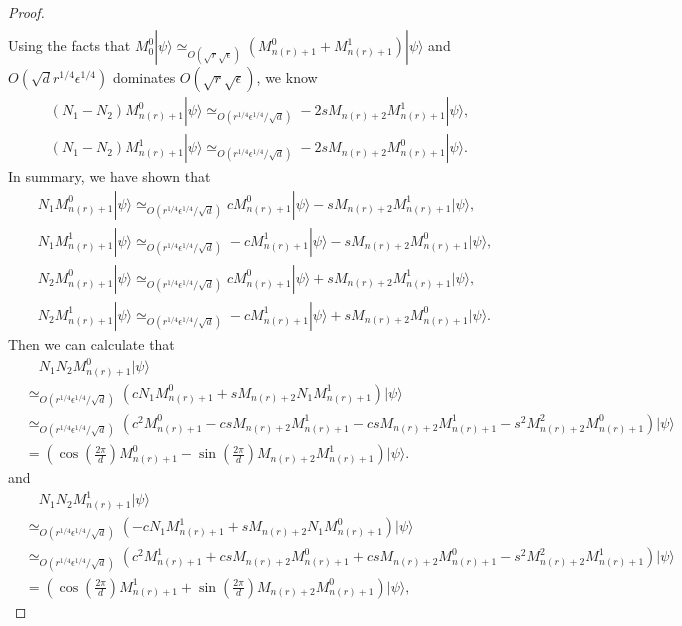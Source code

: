 \documentclass[11pt,letterpaper]{article}
\newcommand{\ket}[1]{|#1\rangle}
\newcommand{\1}{\mathbb{1}}
\newcommand{\nr}{n(r)}
\newcommand{\se}{\sqrt{\epsilon}}
\newcommand{\qe}{\epsilon^{1/4}}
\newcommand{\sd}{\sqrt{d}}
\newcommand{\sr}{\sqrt{r}}
\newcommand{\qr}{r^{1/4}}
\newcommand{\appd}[1]{\simeq_{#1}}
\theoremstyle{definition}
\begin{document}
\begin{proof}
\begin{align*}
	\end{align*}
	Using the facts that $M_0^0 \ket{\psi} \appd{O(\sr \se)} (M_{\nr+1}^0 + M_{\nr+1}^1) \ket{\psi}$
	and $O(\sd \qr \qe)$ dominates $O(\sr \se)$, we know
	\begin{align}
		(N_1-N_2) M_{\nr+1}^0 \ket{\psi} \appd{O(\qr\qe/\sd )} -2sM_{\nr+2} M_{\nr+1}^1 \ket{\psi},\\
		(N_1-N_2) M_{\nr+1}^1 \ket{\psi}\appd{O(\qr\qe/\sd )} -2sM_{\nr+2} M_{\nr+1}^0 \ket{\psi}.
	\end{align}
	In summary, we have shown that 
        \begin{align*}
        		&N_1M_{\nr+1}^0 \ket{\psi} \appd{O(\qr \qe/ \sd)} cM_{\nr+1}^0\ket{\psi} - sM_{\nr+2}M_{\nr+1}^1\ket{\psi},\\
        		&N_1M_{\nr+1}^1 \ket{\psi} \appd{O(\qr \qe/ \sd)} -cM_{\nr+1}^1\ket{\psi} - sM_{\nr+2}M_{\nr+1}^0\ket{\psi},\\
        		&N_2M_{\nr+1}^0 \ket{\psi} \appd{O( \qr \qe /\sd)} cM_{\nr+1}^0\ket{\psi} + sM_{\nr+2}M_{\nr+1}^1\ket{\psi},\\
        		&N_2M_{\nr+1}^1 \ket{\psi} \appd{O(\qr \qe/ \sd )} -cM_{\nr+1}^1\ket{\psi} + sM_{\nr+2}M_{\nr+1}^0\ket{\psi}.
        \end{align*}
        Then we can calculate that 
        \begin{align*}
        		&\quad N_1N_2 M_{\nr+1}^0 \ket{\psi} \\
		        &\appd{O(\qr \qe/\sd)} (c N_1M_{\nr+1}^0 +sM_{\nr+2}N_1M_{\nr+1}^1)\ket{\psi}\\
        		&\appd{O( \qr \qe/\sd)}(c^2M_{\nr+1}^0- csM_{\nr+2}M_{\nr+1}^1 -csM_{\nr+2}M_{\nr+1}^1 -s^2 M_{\nr+2}^2 M_{\nr+1}^0)\ket{\psi}\\
        		&= (\cos(\frac{2\pi}{d}) M_{\nr+1}^0 - \sin(\frac{2\pi}{d}) M_{\nr+2}M_{\nr+1}^1)\ket{\psi}.
        \end{align*}
        and 
        \begin{align*}
            &\quad N_1N_2 M_{\nr+1}^1 \ket{\psi} \\
		    &\appd{O( \qr \qe/\sd)} (-c N_1M_{\nr+1}^1 +sM_{\nr+2}N_1M_{\nr+1}^0)\ket{\psi}\\
        		&\appd{O(\qr \qe/\sd)}(c^2M_{\nr+1}^1+ csM_{\nr+2}M_{\nr+1}^0 +csM_{\nr+2}M_{\nr+1}^0 -s^2 M_{\nr+2}^2 M_{\nr+1}^1)\ket{\psi}\\
        		&= (\cos(\frac{2\pi}{d}) M_{\nr+1}^1 + \sin(\frac{2\pi}{d}) M_{\nr+2}M_{\nr+1}^0)\ket{\psi},
        \end{align*}

\end{proof}
\end{document}
